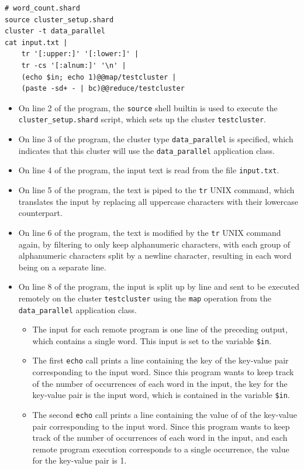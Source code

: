 \documentclass[twoside]{report}
\begin{document}
\begin{minipage}[c]{\textwidth-15pt}
  \begin{lstlisting}[language=Shard]
# word_count.shard
source cluster_setup.shard
cluster -t data_parallel
cat input.txt |
    tr '[:upper:]' '[:lower:]' |
    tr -cs '[:alnum:]' '\n' |
    (echo $in; echo 1)@@map/testcluster |
    (paste -sd+ - | bc)@@reduce/testcluster
\end{lstlisting}
  \smallskip
\end{minipage}

\begin{itemize}
  \item On line 2 of the program, the \texttt{source} shell builtin is used to execute the \texttt{cluster\_setup.shard} script, which sets up the cluster \texttt{testcluster}.
  \item On line 3 of the program, the cluster type \texttt{data\_parallel} is specified, which indicates that this cluster will use the \texttt{data\_parallel} application class.
  \item
        On line 4 of the program, the input text is read from the file \texttt{input.txt}.
  \item
        On line 5 of the program, the text is piped to the \texttt{tr} UNIX command, which translates the input by replacing all uppercase characters with their lowercase counterpart.
  \item
        On line 6 of the program, the text is modified by the \texttt{tr} UNIX command again, by filtering to only keep alphanumeric characters, with each group of alphanumeric characters split by a newline character, resulting in each word being on a separate line.
  \item
        On line 8 of the program, the input is split up by line and sent to be executed remotely on the cluster \texttt{testcluster} using the \texttt{map} operation from the \texttt{data\_parallel} application class.
        \begin{itemize}
          \item The input for each remote program is one line of the preceding output, which contains a single word. This input is set to the variable \texttt{\$in}.
          \item The first \texttt{echo} call prints a line containing the key of the key-value pair corresponding to the input word.
                Since this program wants to keep track of the number of occurrences of each word in the input, the key for the key-value pair is the input word, which is contained in the variable \texttt{\$in}.
          \item The second \texttt{echo} call prints a line containing the value of of the key-value pair corresponding to the input word.
                Since this program wants to keep track of the number of occurrences of each word in the input, and each remote program execution corresponds to a single occurrence, the value for the key-value pair is 1.
        \end{itemize}


\end{itemize}
\end{document}
